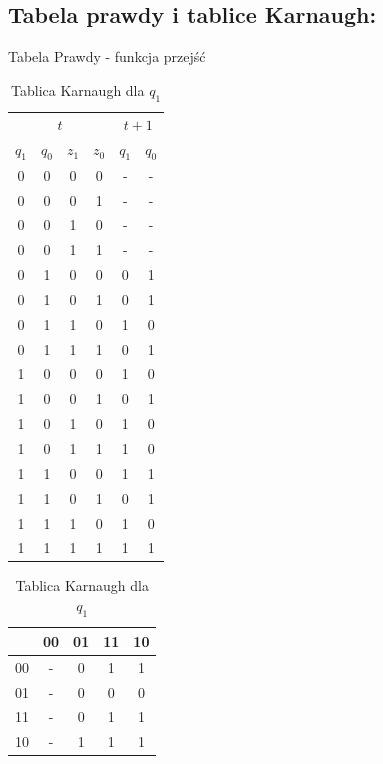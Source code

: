 \documentclass[12pt,a4paper]{article}
\begin{document}
		\subsection{Tabela prawdy i tablice Karnaugh:}
			\begin{table}[H]
			\begin{minipage}{.5\textwidth}
				\caption{Tabela Prawdy - funkcja przejść}
				\vspace{0.2cm}
				\centering
				\begin{tabular}{cccc|cc}
					\multicolumn{4}{c|}{\(t\)}	&	\multicolumn{2}{c}{\(t+1\)} \\
					\(q_1\)&\(q_0\)&\(z_1\)&\(z_0\)&\(q_1\)&\(q_0\)\\\hline
					0	&	0	&	0	&	0	&	-	&	-	\\
					0	&	0	&	0	&	1	&	-	&	-	\\
					0	&	0	&	1	&	0	&	-	&	-	\\
					0	&	0	&	1	&	1	&	-	&	-	\\\hline
					0	&	1	&	0	&	0	&	0	&	1	\\
					0	&	1	&	0	&	1	&	0	&	1	\\
					0	&	1	&	1	&	0	&	1	&	0	\\
					0	&	1	&	1	&	1	&	0	&	1	\\\hline
					1	&	0	&	0	&	0	&	1	&	0	\\
					1	&	0	&	0	&	1	&	0	&	1	\\
					1	&	0	&	1	&	0	&	1	&	0	\\
					1	&	0	&	1	&	1	&	1	&	0	\\\hline
					1	&	1	&	0	&	0	&	1	&	1	\\
					1	&	1	&	0	&	1	&	0	&	1	\\
					1	&	1	&	1	&	0	&	1	&	0	\\
					1	&	1	&	1	&	1	&	1	&	1	\\
				\end{tabular}
			\end{minipage}%
			\begin{minipage}{.5\textwidth}
				\caption{Tablica Karnaugh dla $q_1$}
				\vspace{0.2cm}
				\centering
				\begin{tabular}{c|c|c|c|c}
					\backslashbox{$z_1z_0$}{$q_1q_0$}&00&01&11&10\\\hline
					00	&	-	&	0	&	1	&	1	\\\hline
					01	&	-	&	0	&	0	&	0	\\\hline
					11	&	-	&	0	&	1	&	1	\\\hline
					10	&	-	&	1	&	1	&	1	
				\end{tabular}
				\vspace{1cm}
				

\end{minipage}
\end{table}
\end{document}
